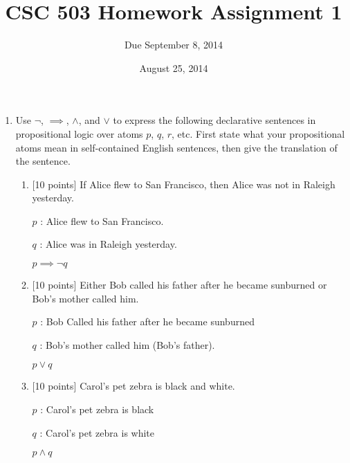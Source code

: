 \documentclass{article}
\title{CSC 503 Homework Assignment 1}
\author{Due September 8, 2014}
\date{August 25, 2014}
\begin{document}
\maketitle

\begin{enumerate}

\item Use $\neg$, $\implies$, $\land$, and $\lor$ to express the
  following declarative sentences in propositional logic over atoms
  $p$, $q$, $r$, etc.  First state what your propositional atoms mean
  in self-contained English sentences, then give the translation of
  the sentence.

  \begin{enumerate}

  \item {[10 points]} If Alice flew to San Francisco, then Alice was
    not in Raleigh yesterday.

	\begin{answer}
	
		$p$ : Alice flew to San Francisco.
		
		$q$ : Alice was in Raleigh yesterday.
		
		$p \implies \neg q$	
		
	\end{answer}	

  \item {[10 points]} Either Bob called his father after he became
    sunburned or Bob's mother called him.
    
    \begin{answer}
    	
    	$p$ : Bob Called his father after he became sunburned
    	
    	$q$ : Bob's mother called him (Bob's father).
    	
    	$p \lor q$
    	
    \end{answer}

  \item {[10 points]} Carol's pet zebra is black and white.
  
  	\begin{answer}
  		
  		$p$ : Carol's pet zebra is black
  		
  		$q$ : Carol's pet zebra is white
  		
  		$p \land q$
  		
  	\end{answer}


\end{enumerate}
\end{enumerate}
\end{document}
